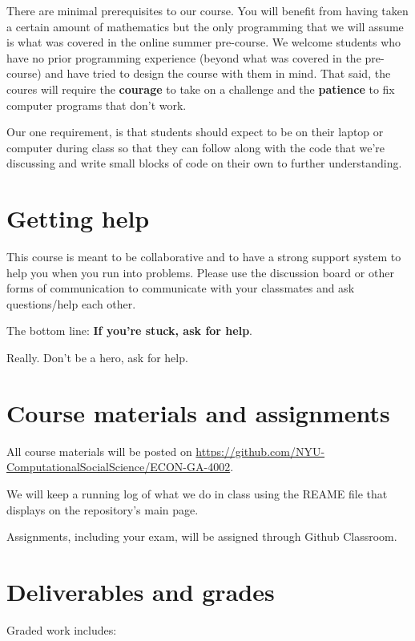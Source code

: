 \documentclass[12pt,pdftex,twoside,letterpaper]{exam}
\begin{document}
  There are minimal prerequisites to our course. You will benefit from having taken a certain
  amount of mathematics but the only programming that we will assume is what was covered in the
  online summer pre-course. We welcome students who have no prior programming experience (beyond
  what was covered in the pre-course) and have tried to design the course with them in mind. That
  said, the coures will require the {\bf courage} to take on a challenge and the {\bf patience} to
  fix computer programs that don't work.

  Our one requirement, is that students should expect to be on their laptop or computer during
  class so that they can follow along with the code that we're discussing and write small blocks
  of code on their own to further understanding.

  \section*{Getting help}

    This course is meant to be collaborative and to have a strong support system to help you when
    you run into problems. Please use the discussion board or other forms of communication to
    communicate with your classmates and ask questions/help each other.

    The bottom line:  {\bf If you're stuck, ask for help\/}.

    Really.  Don't be a hero, ask for help.

  \section*{Course materials and assignments}

    All course materials will be posted on \href{Github}{https://github.com/NYU-ComputationalSocialScience/ECON-GA-4002}.

    We will keep a running log of what we do in class using the REAME file that displays on the
    repository's main page.

    Assignments, including your exam, will be assigned through Github Classroom.

  \section*{Deliverables and grades}

    Graded work includes:
\end{document}
